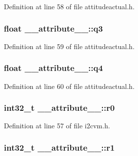 \-Definition at line 58 of file attitudeactual.\-h.

\hypertarget{struct____attribute_____a2f02109202cab2a1752138bc83390485}{
\subsubsection[{q3}]{\setlength{\rightskip}{0pt plus 5cm}float {\bf \-\_\-\-\_\-attribute\-\_\-\-\_\-\-::q3}}}\label{struct____attribute_____a2f02109202cab2a1752138bc83390485}


\-Definition at line 59 of file attitudeactual.\-h.

\hypertarget{struct____attribute_____a265c0771cf94dc277b9e048b5ac0ea32}{
\subsubsection[{q4}]{\setlength{\rightskip}{0pt plus 5cm}float {\bf \-\_\-\-\_\-attribute\-\_\-\-\_\-\-::q4}}}\label{struct____attribute_____a265c0771cf94dc277b9e048b5ac0ea32}


\-Definition at line 60 of file attitudeactual.\-h.

\hypertarget{struct____attribute_____a925baf38083c726d669304ea67c36074}{
\subsubsection[{r0}]{\setlength{\rightskip}{0pt plus 5cm}int32\-\_\-t {\bf \-\_\-\-\_\-attribute\-\_\-\-\_\-\-::r0}}}\label{struct____attribute_____a925baf38083c726d669304ea67c36074}


\-Definition at line 57 of file i2cvm.\-h.

\hypertarget{struct____attribute_____ab9207ad4b7a4c8825f2026d46df45e3a}{
\subsubsection[{r1}]{\setlength{\rightskip}{0pt plus 5cm}int32\-\_\-t {\bf \-\_\-\-\_\-attribute\-\_\-\-\_\-\-::r1}}}\label{struct____attribute_____ab9207ad4b7a4c8825f2026d46df45e3a}


